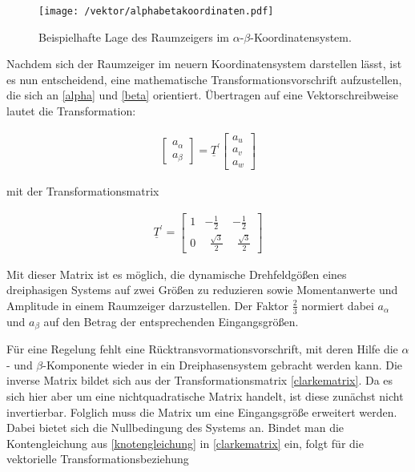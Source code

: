 \begin{figure}[h]
	\centering
	\texttt{[image: /vektor/alphabetakoordinaten.pdf]}
	\label{fig:alphabetakoordinaten}
	\caption{Beispielhafte Lage des Raumzeigers im $\alpha$-$\beta$-Koordinatensystem.}
\end{figure}

Nachdem sich der Raumzeiger im neuern Koordinatensystem darstellen lässt, ist es nun entscheidend, eine mathematische Transformationsvorschrift aufzustellen, die sich an \ref{alpha} und \ref{beta} orientiert. 
Übertragen auf eine Vektorschreibweise lautet die Transformation:

\begin{align}
	\begin{bmatrix}
	a_{\alpha} \\
	a_{\beta} 
	\end{bmatrix}
	=\underline{T}^{\prime}
	\begin{bmatrix}
	a_{u} \\
	a_{v} \\
	a_{w}
	\end{bmatrix}
	\label{clarkevektor}
\end{align}

mit der Transformationsmatrix

\begin{align}
	\underline{T}^{\prime} = 
	\begin{bmatrix}
		1 & -\frac{1}{2} & -\frac{1}{2}  \\
		0 & ~~\frac{\sqrt{3}}{2} & ~~\frac{\sqrt{3}}{2}
	\end{bmatrix}
	\label{clarkematrix}
\end{align}

Mit dieser Matrix ist es möglich, die dynamische Drehfeldgößen eines dreiphasigen Systems auf zwei Größen zu reduzieren sowie Momentanwerte und Amplitude in einem Raumzeiger darzustellen.
Der Faktor $\frac{2}{3}$ normiert dabei $a_{\alpha}$ und $a_{\beta}$ auf den Betrag der entsprechenden Eingangsgrößen.

Für eine Regelung fehlt eine Rücktransvormationsvorschrift, mit deren Hilfe die $\alpha$- und $\beta$-Komponente wieder in ein Dreiphasensystem gebracht werden kann.
Die inverse Matrix bildet sich aus der Transformationsmatrix \ref{clarkematrix}. 
Da es sich hier aber um eine nichtquadratische Matrix handelt, ist diese zunächst nicht invertierbar.
Folglich muss die Matrix um eine Eingangsgröße erweitert werden.
Dabei bietet sich die Nullbedingung des Systems an.
Bindet man die Kontengleichung aus \ref{knotengleichung} in \ref{clarkematrix} ein, folgt für die vektorielle Transformationsbeziehung

